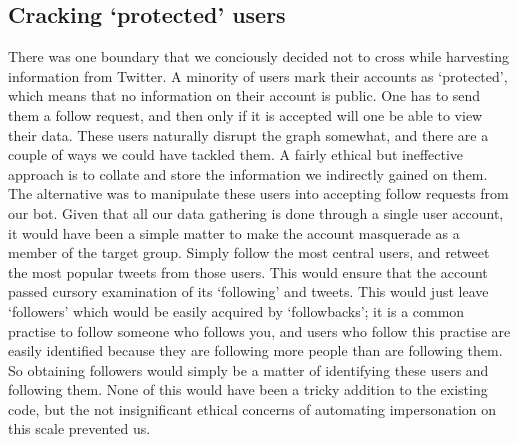 \subsection{Cracking `protected' users}
There was one boundary that we conciously decided not to cross while harvesting information from Twitter. A minority of users mark their accounts as `protected', which means that no information on their account is public. One has to send them a follow request, and then only if it is accepted will one be able to view their data. These users naturally disrupt the graph somewhat, and there are a couple of ways we could have tackled them. A fairly ethical but ineffective approach is to collate and store the information we indirectly gained on them. The alternative was to manipulate these users into accepting follow requests from our bot. Given that all our data gathering is done through a single user account, it would have been a simple matter to make the account masquerade as a member of the target group. Simply follow the most central users, and retweet the most popular tweets from those users. This would ensure that the account passed cursory examination of its `following' and tweets. This would just leave `followers' which would be easily acquired by `followbacks'; it is a common practise to follow someone who follows you, and users who follow this  practise are easily identified because they are following more people than are following them. So obtaining followers would simply be a matter of identifying these users and following them. None of this would have been a tricky addition to the existing code, but the not insignificant ethical concerns of automating impersonation on this scale prevented us.







